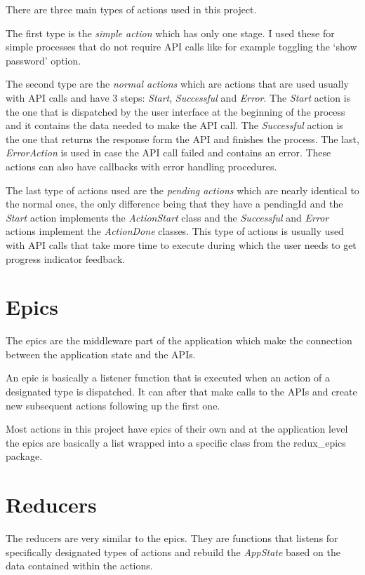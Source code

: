\documentclass[a4paper,12pt]{report}
\begin{document}
There are three main types of actions used in this project.

The first type is the \textit{simple action} which has only one stage. I used
these for simple processes that do not require API calls like for example
toggling the `show password' option.

The second type are the \textit{normal actions} which are actions that are used
usually with API calls and have 3 steps: \textit{Start}, \textit{Successful}
and \textit{Error}. The \textit{Start} action is the one that is dispatched by
the user interface at the beginning of the process and it contains the data
needed to make the API call. The \textit{Successful} action is the one that
returns the response form the API and finishes the process. The last,
\textit{ErrorAction} is used in case the API call failed and contains an error.
These actions can also have callbacks with error handling procedures.

The last type of actions used are the \textit{pending actions} which are nearly
identical to the normal ones, the only difference being that they have a
pendingId and the \textit{Start} action implements the \textit{ActionStart}
class and the \textit{Successful} and \textit{Error} actions implement the
\textit{ActionDone} classes. This type of actions is usually used with API
calls that take more time to execute during which the user needs to get
progress indicator feedback.

\section{Epics}

The epics are the middleware part of the application which make the connection
between the application state and the APIs.

An epic is basically a listener function that is executed when an action of a
designated type is dispatched. It can after that make calls to the APIs and
create new subsequent actions following up the first one.

Most actions in this project have epics of their own and at the application
level the epics are basically a list wrapped into a specific class from the
redux\_epics\cite{reduxEpicsDocs} package.

\section{Reducers}

The reducers are very similar to the epics. They are functions that listens for
specifically designated types of actions and rebuild the \textit{AppState}
based on the data contained within the actions.
\end{document}

